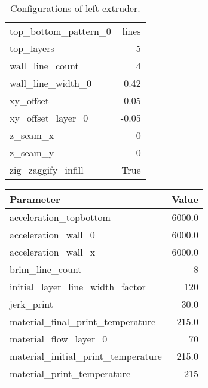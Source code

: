 \begin{multicols}{2}
\begin{table}[H]
\begin{tabular}{ |l|r| }
            top\_bottom\_pattern\_0               & lines          \\
            top\_layers                           & 5              \\
            wall\_line\_count                     & 4              \\
            wall\_line\_width\_0                  & 0.42           \\
            xy\_offset                            & -0.05          \\
            xy\_offset\_layer\_0                  & -0.05          \\
            z\_seam\_x                            & 0              \\
            z\_seam\_y                            & 0              \\
            zig\_zaggify\_infill                  & True           \\
            \hline
        \end{tabular}
        \caption{Configurations of left extruder.}
    \end{table}
    \columnbreak
    \begin{table}[H]
        \scriptsize
        \centering
        \begin{tabular}{|l|r|}
            \hline
            \textbf{Parameter}                    & \textbf{Value} \\
            \hline
            acceleration\_topbottom               & 6000.0         \\
            acceleration\_wall\_0                 & 6000.0         \\
            acceleration\_wall\_x                 & 6000.0         \\
            brim\_line\_count                     & 8              \\
            initial\_layer\_line\_width\_factor   & 120            \\
            jerk\_print                           & 30.0           \\
            material\_final\_print\_temperature   & 215.0          \\
            material\_flow\_layer\_0              & 70             \\
            material\_initial\_print\_temperature & 215.0          \\
            material\_print\_temperature          & 215            \\

\end{tabular}
\end{table}
\end{multicols}
